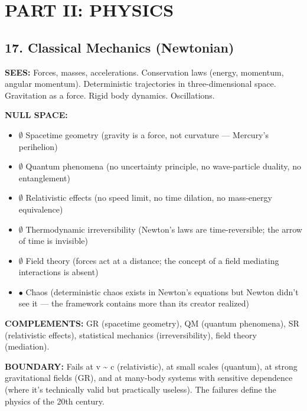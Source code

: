 \bigskip\noindent\makebox[\textwidth]{\color{rulegray}\rule{5cm}{0.3pt}}\bigskip


\chapter*{PART II: PHYSICS}


\section*{17. Classical Mechanics (Newtonian)}


\textbf{SEES:} Forces, masses, accelerations. Conservation laws (energy, momentum, angular momentum). Deterministic trajectories in three-dimensional space. Gravitation as a force. Rigid body dynamics. Oscillations.


\textbf{NULL SPACE:}

\begin{itemize}[nosep,leftmargin=*]
  \item $\emptyset$ Spacetime geometry (gravity is a force, not curvature — Mercury's perihelion)
  \item $\emptyset$ Quantum phenomena (no uncertainty principle, no wave-particle duality, no entanglement)
  \item $\emptyset$ Relativistic effects (no speed limit, no time dilation, no mass-energy equivalence)
  \item $\emptyset$ Thermodynamic irreversibility (Newton's laws are time-reversible; the arrow of time is invisible)
  \item $\emptyset$ Field theory (forces act at a distance; the concept of a field mediating interactions is absent)
  \item $\bullet$ Chaos (deterministic chaos exists in Newton's equations but Newton didn't see it — the framework contains more than its creator realized)
\end{itemize}


\textbf{COMPLEMENTS:} GR (spacetime geometry), QM (quantum phenomena), SR (relativistic effects), statistical mechanics (irreversibility), field theory (mediation).


\textbf{BOUNDARY:} Fails at v \textasciitilde{} c (relativistic), at small scales (quantum), at strong gravitational fields (GR), and at many-body systems with sensitive dependence (where it's technically valid but practically useless). The failures define the physics of the 20th century.


